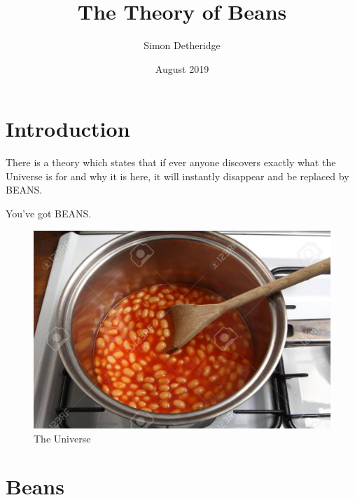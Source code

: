 \documentclass{article}
\title{The Theory of Beans}
\author{Simon Detheridge}
\date{August 2019}
\begin{document}
\maketitle

\section{Introduction}
There is a theory which states that if ever anyone discovers exactly what the Universe is for and why it is here, it will instantly disappear and be replaced by BEANS.

You've got BEANS.

\begin{figure}[h!]
\centering
\includegraphics[scale=0.2]{beans.jpg}
\caption{The Universe}
\label{fig:universe}
\end{figure}

\section{Beans}
\end{document}
